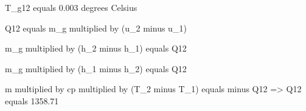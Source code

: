 T_g12 equals 0.003 degrees Celsius  

Q12 equals m_g multiplied by (u_2 minus u_1)  

m_g multiplied by (h_2 minus h_1) equals Q12  

m_g multiplied by (h_1 minus h_2) equals Q12  

m multiplied by cp multiplied by (T_2 minus T_1) equals minus Q12  
=> Q12 equals 1358.71